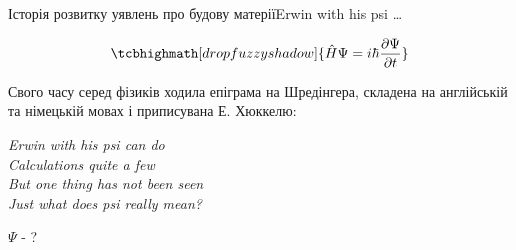 \documentclass[10pt]{beamer}
\begin{document}
\begin{frame}[t]{Історія розвитку уявлень про будову матерії}{Erwin with his psi \ldots}
	\begin{center}
		\begin{equation*}
			\tcbhighmath[drop fuzzy shadow]{\hat{H} \Psi = i\hbar \frac{\partial \Psi}{\partial t}}
		\end{equation*}
	\end{center}
	Свого часу серед фізиків ходила епіграма на Шредінгера, складена на англійській та німецькій мовах і приписувана Е. Хюккелю:

	\begin{center}\itshape
		Erwin with his psi can do \\
		Calculations quite a few \\
		But one thing has not been seen \\
		Just what does psi really mean?
	\end{center}

	\begin{center}\huge
		$\Psi$ - ?
	\end{center}
\end{frame}
\end{document}

